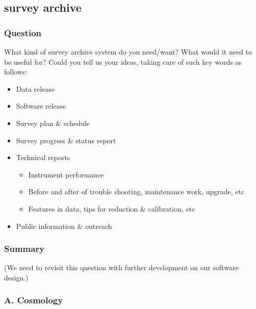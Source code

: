 \documentclass[a4paper,notitlepage]{article}
\begin{document}
\renewcommand{\thesubsection}{Q.6.0-\alph{subsection}}
\setcounter{subsection}{0}
\subsection{survey archive}

\subsubsection{Question}
What kind of survey archive system do you need/want?
          What would it need to be useful for? Could you tell us
          your ideas, taking care of such key words as follows:
          \begin{itemize}
           \item Data release
           \item Software release
           \item Survey plan \& schedule
           \item Survey progress \& status report
           \item Technical reports
             \begin{itemize}
              \item Instrument performance
              \item Before and after of trouble shooting,
                maintenance work, upgrade, etc
              \item Features in data, tips for
                reduction \& calibration, etc
             \end{itemize}
           \item Public information \& outreach
          \end{itemize}

\subsubsection{Summary}

(We need to revisit this question with further development on our software 
design.) 

\subsubsection{A. Cosmology}
\end{document}
